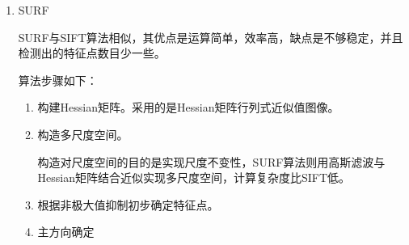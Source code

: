 \begin{enumerate}
\begin{enumerate}
\item 统计每个单元内所有像素点的梯度直方图，将其作为每个单元的描述子。首先将梯度方向分为$m$份（共360度），如果分为了16份（如图~\ref{fig: bin}），则每一份中是22.5度。然后看每个像素点的梯度方向是落在了哪一份中，对应直方图中的那一份就加上一个权值，这里的权值就是像素点的梯度大小。
\begin{figure}
\centering
\texttt{[image: bin]}
\caption{梯度方向bin}
\label{fig: bin}
\end{figure}
       
\item 相邻的几个单元可以组成一个更大的块（block）（例如$3 \times 3 $个cell/block），再将一个块内所有单元的梯度直方图串联起来，最后得到该块的方向梯度直方图特征描述子。在将单元组合成块时，块与块之间是可以有重合的，这样，每个单元的梯度直方图都会被多次使用，以串联生成块的梯度直方图特征。其中块既可以按矩形划分（R-HOG），也可以按环形划分（C-HOG），具体见图~\ref{fig:shape}。
    
\begin{figure}
\centering
\texttt{[image: shape]}
\caption{矩形区间和环形区间}
\label{fig:shape}
\end{figure}
        
\item 将图像内的所有块的梯度方向直方图特征串联起来就可以得到整幅图像的梯度方向直方图特征描述子了，这个就是最终的可供分类使用的特征向量。该向量的维数为$m \times n \times \alpha$，其中$m$表示每个单元中方向bin的数目，$n$、$\alpha$分别表示块的个数以及一个块中的单元数目。
\end{enumerate}

\item SURF

SURF与SIFT算法相似，其优点是运算简单，效率高，缺点是不够稳定，并且检测出的特征点数目少一些。

算法步骤如下：

\begin{enumerate}
\item 构建Hessian矩阵。采用的是Hessian矩阵行列式近似值图像。

\item 构造多尺度空间。

构造对尺度空间的目的是实现尺度不变性，SURF算法则用高斯滤波与Hessian矩阵结合近似实现多尺度空间，计算复杂度比SIFT低。

\item 根据非极大值抑制初步确定特征点。

\item 主方向确定


\end{enumerate}
\end{enumerate}
